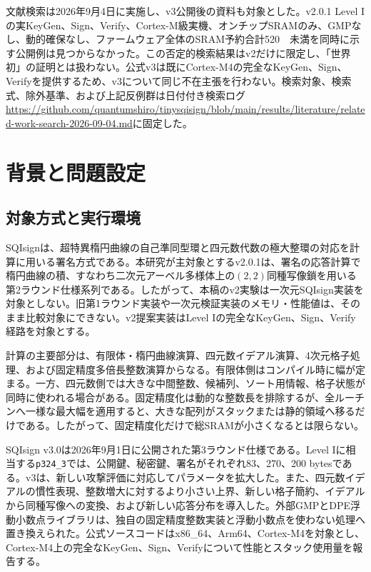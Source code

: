 \documentclass[a4paper,10pt]{ltjsarticle}
\theoremstyle{definition}
\theoremstyle{remark}
\begin{document}
文献検索は2026年9月4日に実施し、v3公開後の資料も対象とした。v2.0.1 Level Iの実KeyGen、Sign、Verify、Cortex-M級実機、オンチップSRAMのみ、GMPなし、動的確保なし、ファームウェア全体のSRAM予約合計\SI{520}{\kibi\byte}未満を同時に示す公開例は見つからなかった。この否定的検索結果はv2だけに限定し、「世界初」の証明とは扱わない。公式v3は既にCortex-M4の完全なKeyGen、Sign、Verifyを提供するため、v3について同じ不在主張を行わない。検索対象、検索式、除外基準、および上記反例群は日付付き検索ログ\url{https://github.com/quantumshiro/tinysqisign/blob/main/results/literature/related-work-search-2026-09-04.md}に固定した。

\section{背景と問題設定}
\label{sec:background}

\subsection{対象方式と実行環境}

SQIsignは、超特異楕円曲線の自己準同型環と四元数代数の極大整環の対応を計算に用いる署名方式である\cite{sqisign-2020}。本研究が主対象とするv2.0.1は、署名の応答計算で楕円曲線の積、すなわち二次元アーベル多様体上の$(2,2)$同種写像鎖を用いる第2ラウンド仕様系列である\cite{sqisign-spec-v201}。したがって、本稿のv2実験は一次元SQIsign実装を対象としない。旧第1ラウンド実装や一次元検証実装のメモリ・性能値は、そのまま比較対象にできない。v2提案実装はLevel Iの完全なKeyGen、Sign、Verify経路を対象とする。

計算の主要部分は、有限体・楕円曲線演算、四元数イデアル演算、4次元格子処理、および固定精度多倍長整数演算からなる。有限体側はコンパイル時に幅が定まる。一方、四元数側では大きな中間整数、候補列、ソート用情報、格子状態が同時に使われる場合がある。固定精度化は動的な整数長を排除するが、全ルーチンへ一様な最大幅を適用すると、大きな配列がスタックまたは静的領域へ移るだけである。したがって、固定精度化だけで総SRAMが小さくなるとは限らない。

SQIsign v3.0は2026年9月1日に公開された第3ラウンド仕様である\cite{sqisign-spec-v3}。Level Iに相当する\texttt{p324\_3}では、公開鍵、秘密鍵、署名がそれぞれ83、270、200 bytesである。v3は、新しい攻撃評価に対応してパラメータを拡大した。また、四元数イデアルの慣性表現、整数増大に対するより小さい上界、新しい格子簡約、イデアルから同種写像への変換、および新しい応答分布を導入した。外部GMPとDPE浮動小数点ライブラリは、独自の固定精度整数実装と浮動小数点を使わない処理へ置き換えられた。公式ソースコードはx86\_64、Arm64、Cortex-M4を対象とし、Cortex-M4上の完全なKeyGen、Sign、Verifyについて性能とスタック使用量を報告する\cite{sqisign-spec-v3,sqisign-code-v3}。
\end{document}
